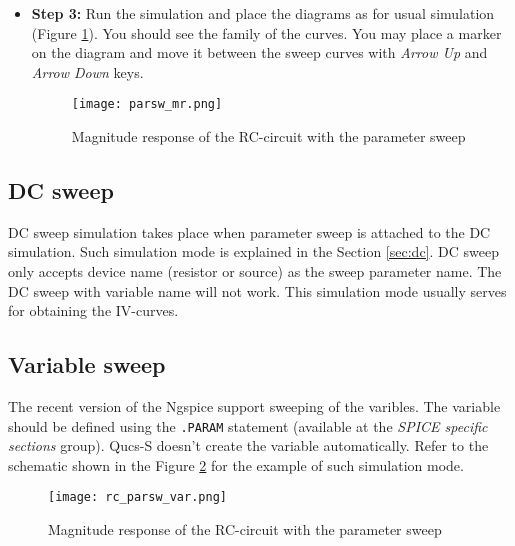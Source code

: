 \begin{itemize}
\item \textbf{Step 3:} Run the simulation and place the diagrams as for usual simulation (Figure \ref{fig:parsw_mr}). You should see the family of the curves. You may place a marker on the diagram and move it between the sweep curves with \emph{Arrow Up} and \emph{Arrow Down} keys.

        \begin{figure}[!ht]
        \begin{center}
            \texttt{[image: parsw\_mr.png]}
        \end{center}
        \caption{Magnitude response of the RC-circuit with the parameter sweep}
    \label{fig:parsw_mr}
    \end{figure}

\end{itemize}


\subsection{DC sweep}

DC sweep simulation takes place when parameter sweep is attached to the DC simulation. Such simulation mode is explained in
the Section \ref{sec:dc}. DC sweep only accepts device name (resistor or source) as the sweep parameter name. The DC sweep with variable name will not work. This simulation mode usually serves for obtaining the IV-curves.

\subsection{Variable sweep}

The recent version of the Ngspice support sweeping of the varibles. The variable should be defined using the \verb|.PARAM|
statement (available at the \emph{SPICE specific sections} group). Qucs-S doesn't create the variable automatically. Refer to the schematic shown in the Figure \ref{fig:rc_parsw_var} for the example of such simulation mode.

        \begin{figure}[!ht]
        \begin{center}
            \texttt{[image: rc\_parsw\_var.png]}
        \end{center}
        \caption{Magnitude response of the RC-circuit with the parameter sweep}
    \label{fig:rc_parsw_var}
    \end{figure}

